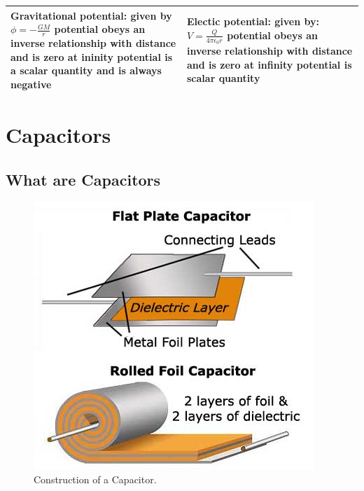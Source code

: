 \documentclass{scrbook}
\begin{document}
\begin{tabular}{| p{0.5\linewidth} | p{0.5\linewidth} |}
		\textbf{Gravitational potential: } \newline given by $\phi = -\frac{GM}{r}$ \newline potential obeys an inverse relationship with distance and is zero at ininity \newline potential is a scalar quantity and is always negative & \textbf{Electic potential: } \newline given by: $V = \frac{Q}{4\pi \epsilon_0 r}$ \newline potential obeys an inverse relationship with distance and is zero at infinity \newline potential is scalar quantity \\ \hline
	\end{tabular}

\section{Capacitors}

\subsection{What are Capacitors}

	\begin{figure}
		\centering
		\includegraphics[width=\linewidth]{assets/capacitor.jpg}
		\caption{Construction of a Capacitor. \cite{lrnabtelec:cap}}
		\label{capint}
	\end{figure}
\end{document}
